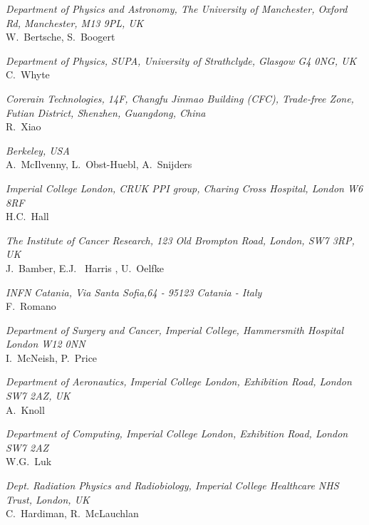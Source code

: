 \vspace{0.5cm}
\noindent \textit{Department of Physics and Astronomy, The University of Manchester, Oxford Rd, Manchester, M13 9PL, UK} \\
W.~Bertsche, S.~Boogert
 
\vspace{0.5cm}
\noindent \textit{Department of Physics, SUPA, University of Strathclyde, Glasgow G4 0NG, UK} \\
C.~Whyte
 
\vspace{0.5cm}
\noindent \textit{Corerain Technologies, 14F, Changfu Jinmao Building (CFC), Trade-free Zone, Futian District, Shenzhen, Guangdong, China} \\
R.~Xiao
 
\vspace{0.5cm}
\noindent \textit{Berkeley, USA} \\
A.~McIlvenny, L.~Obst-Huebl, A.~Snijders
 
\vspace{0.5cm}
\noindent \textit{Imperial College London, CRUK PPI group, Charing Cross Hospital, London W6 8RF} \\
H.C.~Hall
 
\vspace{0.5cm}
\noindent \textit{The Institute of Cancer Research, 123 Old Brompton Road, London, SW7 3RP, UK} \\
J.~Bamber, E.J. ~Harris , U.~Oelfke
 
\vspace{0.5cm}
\noindent \textit{INFN Catania, Via Santa Sofia,64 - 95123 Catania - Italy} \\
F.~Romano
 
\vspace{0.5cm}
\noindent \textit{Department of Surgery and Cancer, Imperial College, Hammersmith Hospital London W12 0NN} \\
I.~McNeish, P.~Price
 
\vspace{0.5cm}
\noindent \textit{Department of Aeronautics, Imperial College London, Exhibition Road, London SW7 2AZ, UK} \\
A.~Knoll
 
\vspace{0.5cm}
\noindent \textit{Department of Computing, Imperial College London, Exhibition Road, London SW7 2AZ} \\
W.G.~Luk
 
\vspace{0.5cm}
\noindent \textit{Dept. Radiation Physics and Radiobiology, Imperial College Healthcare NHS Trust, London, UK} \\
C.~Hardiman, R.~McLauchlan
 
